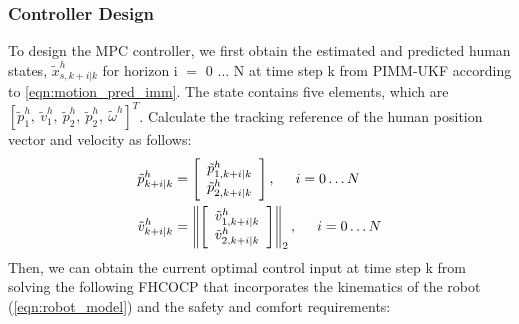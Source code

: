\documentclass[journal]{IEEEtran}
\begin{document}
\subsubsection{Controller Design}
To design the MPC controller, we first obtain the estimated and predicted human states, $\tilde{x}^{h}_{s,k+i|k}$ for horizon i $=$ 0 $\dots$ N at time step k from PIMM-UKF according to \cref{eqn:motion_pred_imm}. The state contains five elements, which are
$\left[\tilde{p}^{h}_{1},~\tilde{v}^{h}_{1},~\tilde{p}^{h}_{2},~\tilde{p}^{h}_{2},~\tilde{\omega}^{h}\right]^T$. %
Calculate the tracking reference of the human position vector and velocity as follows: 
\begin{align}
\tilde{p}^h_{k+i|k}&=
	\left[ \begin{array}{c}
	\tilde{p}^h_{1,k+i|k} \nonumber\\	  
  \tilde{p}^h_{2,k+i|k}\end{array}\right], \hspace{5mm} i = 0 \dots N\\   \tilde{v}^h_{k+i|k}&=
	\left\|\left[ \begin{array}{c}
	\tilde{v}^h_{1,k+i|k} \nonumber\\	\tilde{v}^h_{2,k+i|k}\end{array}\right]\right\|_2, \hspace{5mm} i = 0 \dots N
\end{align}
Then, we can obtain the current optimal control input at time step k from solving the following FHCOCP that incorporates the kinematics of the robot (\ref{eqn:robot_model}) and the safety and comfort requirements:
\end{document}
